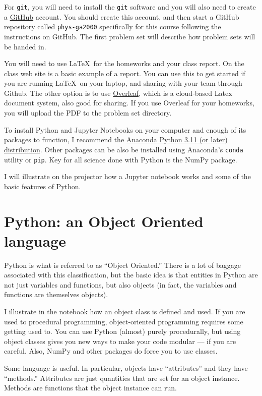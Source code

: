 For {\tt git}, you will need to install the {\tt git} software and you
will also need to create a \href{http://github.com}{\color{red}
GitHub} account. You should create this account, and then start a
GitHub repository called {\tt phys-ga2000} specifically for this course
following the instructions on GitHub. The first problem set will
describe how problem sets will be handed in.

You will need to use \LaTeX\ for the homeworks and your class
report. On the class web site is a basic example of a report. You can
use this to get started if you are running \LaTeX\ on your laptop, and
sharing with your team through Github. The other option is to use
\href{http://overleaf.com}{\color{red} Overleaf}, which is a
cloud-based Latex document system, also good for sharing. If you use
Overleaf for your homeworks, you will upload the PDF to the problem
set directory.

To install Python and Jupyter Notebooks on your computer and enough of
its packages to function, I recommend the
\href{https://www.continuum.io/downloads}{\color{red} Anaconda Python
  3.11 (or later) distribution}. Other packages can be also be
installed using Anaconda's {\tt conda} utility or {\tt pip}. Key for
all science done with Python is the NumPy package.

I will illustrate on the projector how a Jupyter notebook works and
some of the basic features of Python.

\section{Python: an Object Oriented language}

Python is what is referred to as ``Object Oriented.'' There is a lot
of baggage associated with this classification, but the basic idea is
that entities in Python are not just variables and functions, but also
objects (in fact, the variables and functions are themselves
objects). 

I illustrate in the notebook how an object class is defined and
used. If you are used to procedural programming, object-oriented
programming requires some getting used to. You can use Python (almost)
purely procedurally, but using object classes gives you new ways to
make your code modular --- if you are careful. Also, NumPy and other
packages do force you to use classes. 

Some language is useful. In particular, objects have ``attributes''
and they have ``methods.'' Attributes are just quantities that are set
for an object instance. Methods are functions that the object instance
can run. 

